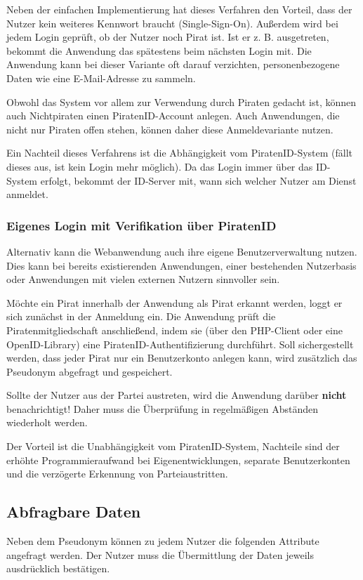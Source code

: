 \documentclass[parskip=half]{scrartcl}
\begin{document}
Neben der einfachen Implementierung hat dieses Verfahren den Vorteil, dass der Nutzer kein weiteres Kennwort braucht (Single-Sign-On).
Außerdem wird bei jedem Login geprüft, ob der Nutzer noch Pirat ist. Ist er z. B. ausgetreten, bekommt die Anwendung das spätestens beim nächsten Login mit.
Die Anwendung kann bei dieser Variante oft darauf verzichten, personenbezogene Daten wie eine E-Mail-Adresse zu sammeln.

Obwohl das System vor allem zur Verwendung durch Piraten gedacht ist, können auch Nichtpiraten einen PiratenID-Account anlegen.
Auch Anwendungen, die nicht nur Piraten offen stehen, können daher diese Anmeldevariante nutzen.

Ein Nachteil dieses Verfahrens ist die Abhängigkeit vom PiratenID-System (fällt dieses aus, ist kein Login mehr möglich).
Da das Login immer über das ID-System erfolgt, bekommt der ID-Server mit, wann sich welcher Nutzer am Dienst anmeldet.


\subsubsection{Eigenes Login mit Verifikation über PiratenID}
Alternativ kann die Webanwendung auch ihre eigene Benutzerverwaltung nutzen.
Dies kann bei bereits existierenden Anwendungen, einer bestehenden Nutzerbasis oder Anwendungen mit vielen externen Nutzern sinnvoller sein.

Möchte ein Pirat innerhalb der Anwendung als Pirat erkannt werden, loggt er sich zunächst in der Anmeldung ein.
Die Anwendung prüft die Piratenmitgliedschaft anschließend, indem sie (über den PHP-Client oder eine OpenID-Library) eine PiratenID-Authentifizierung durchführt.
Soll sichergestellt werden, dass jeder Pirat nur ein Benutzerkonto anlegen kann, wird zusätzlich das Pseudonym abgefragt und gespeichert.

Sollte der Nutzer aus der Partei austreten, wird die Anwendung darüber \textbf{nicht} benachrichtigt!
Daher muss die Überprüfung in regelmäßigen Abständen wiederholt werden.

Der Vorteil ist die Unabhängigkeit vom PiratenID-System, Nachteile sind der erhöhte Programmieraufwand bei Eigenentwicklungen,
separate Benutzerkonten und die verzögerte Erkennung von Parteiaustritten.

\subsection{Abfragbare Daten}
\label{sec:attribute}
Neben dem Pseudonym können zu jedem Nutzer die folgenden Attribute angefragt werden.
Der Nutzer muss die Übermittlung der Daten jeweils ausdrücklich bestätigen.
\end{document}
